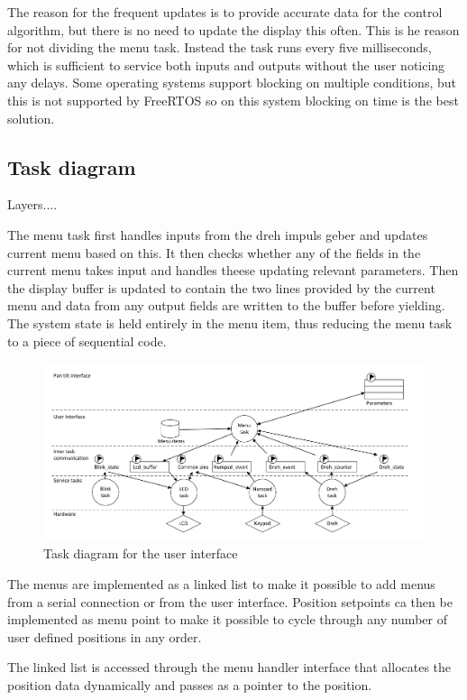 The reason for the frequent updates is to provide accurate data for the control algorithm, but there is no need to update the display this often. This is he reason for not dividing the menu task. Instead the task runs every five milliseconds, which is sufficient to service both inputs and outputs without the user noticing any delays. Some operating systems support blocking on multiple conditions, but this is not supported by FreeRTOS so on this system blocking on time is the best solution.

\subsection{Task diagram}
Layers....

The menu task first handles inputs from the dreh impuls geber and updates current menu based on this. It then checks whether any of the fields in the current menu takes input and handles theese updating relevant parameters. Then the display buffer is updated to contain the two lines provided by the current menu and data from any output fields are written to the buffer before yielding. The system state is held entirely in the menu item, thus reducing the menu task to a piece of sequential code.

\begin{figure}[htb]
	\centering
	\includegraphics[scale=1,trim=0 0 0 0]{graphics/task_diagram_user_interface.pdf} 
	\caption{Task diagram for the user interface}
	\label{fig:ui_task_diagram}
\end{figure}

The menus are implemented as a linked list to make it possible to add menus from a serial connection or from the user interface. Position setpoints ca then be implemented as menu point to make it possible to cycle through any number of user defined positions in any order.

The linked list is accessed through the menu handler interface that allocates the position data dynamically and passes as a pointer to the position.

